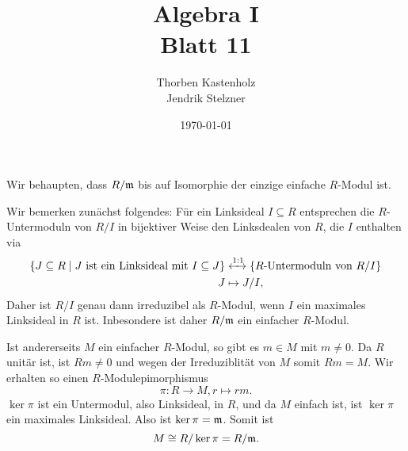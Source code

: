 \documentclass[a4paper,10pt]{article}
\title{\sc Algebra I \\ \Large Blatt 11}
\author{Thorben Kastenholz \\ Jendrik Stelzner}
\date{\today}
\begin{document}
\maketitle





\addtocounter{section}{2}





\section{}
Wir behaupten, dass $R/\mathfrak{m}$ bis auf Isomorphie der einzige einfache $R$-Modul ist.

Wir bemerken zunächst folgendes: Für ein Linksideal $I \subseteq R$ entsprechen die $R$-Untermoduln von $R/I$ in bijektiver Weise den Linksdealen von $R$, die $I$ enthalten via
\begin{align*}
 \{J \subseteq R \mid J \text{ ist ein Linksideal mit } I \subseteq J\} &\xleftrightarrow{1:1}\{\text{$R$-Untermoduln von $R/I$}\} \\
 J &\mapsto J/I,
\end{align*}
Daher ist $R/I$ genau dann irreduzibel als $R$-Modul, wenn $I$ ein maximales Linksideal in $R$ ist. Inbesondere ist daher $R/\mathfrak{m}$ ein einfacher $R$-Modul.

Ist andererseits $M$ ein einfacher $R$-Modul, so gibt es $m \in M$ mit $m \neq 0$. Da $R$ unitär ist, ist $Rm \neq 0$ und wegen der Irreduziblität von $M$ somit $Rm = M$. Wir erhalten so einen $R$-Modulepimorphismus
\[
 \pi : R \to M, r \mapsto rm.
\]
$\ker \pi$ ist ein Untermodul, also Linksideal, in $R$, und da $M$ einfach ist, ist $\ker \pi$ ein maximales Linksideal. Also ist $\ker \pi = \mathfrak{m}$. Somit ist
\[
 M \cong R/\ker \pi = R/\mathfrak{m}.
\]
\end{document}
